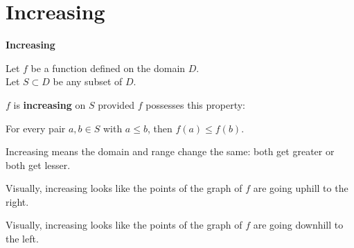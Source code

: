 \documentclass{ximera}
\begin{document}
\section{Increasing}



\begin{definition} \textbf{\textcolor{green!50!black}{Increasing}} 


Let $f$ be a function defined on the domain $D$. \\
Let $S \subset D$ be any subset of $D$.

$f$ is \textbf{increasing} on $S$ provided $f$ possesses this property:  


\begin{center}
For every pair $a, b \in S$ with $a \leq b$, then $f(a) \leq f(b)$.
\end{center}

\end{definition}




\begin{idea}
Increasing means the domain and range change the same: both get greater or both get lesser.
\end{idea}



\begin{observation}
Visually, increasing looks like the points of the graph of $f$ are going uphill to the right.
\end{observation}


\begin{observation}
Visually, increasing looks like the points of the graph of $f$ are going downhill to the left.
\end{observation}
\end{document}
